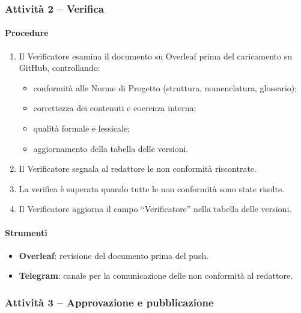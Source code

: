 \documentclass[a4paper, 11pt, oneside]{scrartcl}
\begin{document}
\subsubsection{Attività 2 – Verifica}

\paragraph{Procedure}
\begin{enumerate}
    \item Il Verificatore esamina il documento su Overleaf prima del caricamento su GitHub, controllando:
    \begin{itemize}
        \item conformità alle Norme di Progetto (struttura, nomenclatura, glossario);
        \item correttezza dei contenuti e coerenza interna;
        \item qualità formale e lessicale;
        \item aggiornamento della tabella delle versioni.
    \end{itemize}
    \item Il Verificatore segnala al redattore le non conformità riscontrate.
    \item La verifica è superata quando tutte le non conformità sono state risolte.
    \item Il Verificatore aggiorna il campo ``Verificatore'' nella tabella delle versioni.
\end{enumerate}

\paragraph{Strumenti}
\begin{itemize}
    \item \textbf{Overleaf}: revisione del documento prima del push.
    \item \textbf{Telegram}: canale per la comunicazione delle non conformità al redattore.
\end{itemize}

\subsubsection{Attività 3 – Approvazione e pubblicazione}
\end{document}
